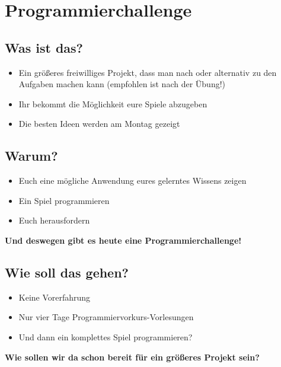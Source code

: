 \section{Programmierchallenge}
\subsection{Was ist das?}
\begin{frame}
    \slidehead
    \pause
    \begin{itemize}
        \item Ein größeres freiwilliges Projekt, dass man nach oder alternativ zu den Aufgaben machen kann (empfohlen ist nach der Übung!)
        \item Ihr bekommt die Möglichkeit eure Spiele abzugeben
        \item Die besten Ideen werden am Montag gezeigt
    \end{itemize}
\end{frame}

\subsection{Warum?}
\begin{frame}
    \slidehead
    \pause
    \begin{itemize}
        \item Euch eine mögliche Anwendung eures gelerntes Wissens zeigen
        \item Ein Spiel programmieren
        \item Euch herausfordern
    \end{itemize}
    \pause
    \vspace{\fill}
    \begin{center}
        \textbf{\huge Und deswegen gibt es heute eine Programmierchallenge!}
    \end{center}
    \vspace{\fill}
\end{frame}

\subsection{Wie soll das gehen?}
\begin{frame}
    \slidehead
    \begin{itemize}
        \item Keine Vorerfahrung
        \item Nur vier Tage Programmiervorkurs-Vorlesungen
        \item Und dann ein komplettes Spiel programmieren?
    \end{itemize}
    \pause
    \vspace{\fill}
    \begin{center}
        \textbf{\huge Wie sollen wir da schon bereit für ein größeres Projekt sein?}
    \end{center}
    \vspace{\fill}
\end{frame}

